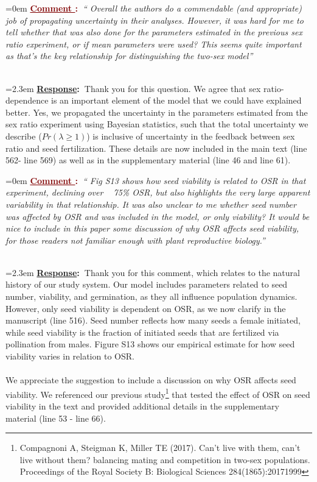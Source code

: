 \documentclass[12pt]{article}
\newcounter{cN}
\newcommand{\comment}[1]{
	\vspace{2em}
	\refstepcounter{cN} %
	\noindent \hangindent=0em \textbf{\textcolor{Maroon}{\uline{Comment \thecN}:~}}\emph{``#1''}
	}
\newcommand{\response}[1]{
	\\[0.25em]
	\hangindent=2.3em \textbf{\textcolor{NavyBlue}{\uline{Response}:~}}#1
	}
\begin{document}
\comment{ Overall the authors do a commendable (and appropriate) job of propagating uncertainty in their analyses. However, it was hard for me to tell whether that was also done for the parameters estimated in the previous sex ratio experiment, or if mean parameters were used? This seems quite important as that’s the key
relationship for distinguishing the two-sex model}
\response{Thank you for this question. We agree that sex ratio-dependence is an important element of the model that we could have explained better. Yes, we propagated the uncertainty in the parameters estimated from the sex ratio experiment using Bayesian statistics, such that the total uncertainty we describe ($Pr(\lambda \ge 1)$) is inclusive of uncertainty in the feedback between sex ratio and seed fertilization. 
These details are now included in the main text (line 562- line 569) as well as in the supplementary material (line 46 and line 61).}

\comment{ Fig S13 shows how seed viability is related to OSR in that experiment, declining over ~ 75\% OSR, but also highlights
the very large apparent variability in that relationship. It was also unclear to me whether seed number was affected by OSR and was included in the model, or only
viability? It would be nice to include in this paper some discussion of why OSR affects seed viability, for those readers not familiar enough with plant reproductive
biology.}
\response{Thank you for this comment, which relates to the natural history of our study system. 
Our model includes parameters related to seed number, viability, and germination, as they all influence population dynamics. 
However, only seed viability is dependent on OSR, as we now clarify in the manuscript (line  516).
Seed number reflects how many seeds a female initiated, while seed viability is the fraction of initiated seeds that are fertilized via pollination from males. 
Figure S13 shows our empirical estimate for how seed viability varies in relation to OSR. 
\\
\\
We appreciate the suggestion to include a discussion on why OSR affects seed viability. We referenced our previous study\footnote{Compagnoni A, Steigman K, Miller TE (2017). Can’t live with them, can’t live without them? balancing mating and competition in two-sex populations. Proceedings of the Royal Society B: Biological Sciences 284(1865):20171999} that tested the effect of OSR on seed viability in the text and provided additional details in the supplementary material (line 53 - line 66). }
\end{document}
